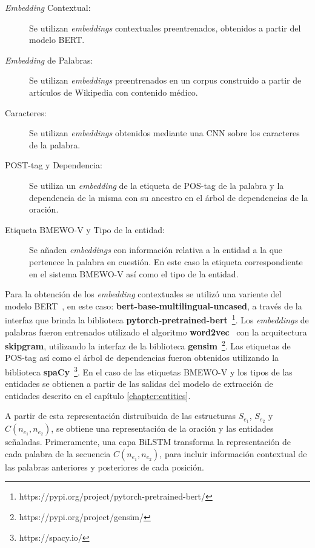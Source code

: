 \begin{description}
	\item[\textit{Embedding} Contextual:] Se utilizan \textit{embeddings} contextuales preentrenados, obtenidos a partir del modelo BERT.
	
	\item[\textit{Embedding} de Palabras:] Se utilizan \textit{embeddings} preentrenados en un corpus construido a partir de artículos de Wikipedia con contenido médico.
	
	\item[Caracteres:] Se utilizan \textit{embeddings} obtenidos mediante una CNN sobre los caracteres de la palabra.
	
	\item[POST-tag y Dependencia:] Se utiliza un \textit{embedding} de la etiqueta de POS-tag de la palabra y la dependencia de la misma con su ancestro en el árbol de dependencias de la oración.
	
	\item[Etiqueta BMEWO-V y Tipo de la entidad:] Se añaden \textit{embeddings} con información relativa a la entidad a la que pertenece la palabra en cuestión.
	En este caso la etiqueta correspondiente en el sistema BMEWO-V así como el tipo de la entidad.
	
\end{description}

Para la obtención de los \textit{embedding} contextuales se utilizó una variente del modelo BERT~\cite{devlin2018bert}, en este caso: \textbf{bert-base-multilingual-uncased}, a través de la interfaz que brinda la biblioteca \textbf{pytorch-pretrained-bert}~\footnote{https://pypi.org/project/pytorch-pretrained-bert/}.
Los \textit{embeddings} de palabras fueron entrenados utilizado el algoritmo \textbf{word2vec}~\cite{mikolov2013efficient} con la arquitectura \textbf{skipgram}, utilizando la interfaz de la biblioteca \textbf{gensim}~\footnote{https://pypi.org/project/gensim/}.
Las etiquetas de POS-tag así como el árbol de dependencias fueron obtenidos utilizando la biblioteca \textbf{spaCy}~\footnote{https://spacy.io/}.
En el caso de las etiquetas BMEWO-V y los tipos de las entidades se obtienen a partir de las salidas del modelo de extracción de entidades descrito en el capítulo \ref{chapter:entities}.

A partir de esta representación distruibuida de las estructuras $S_{e_1}$, $S_{e_2}$ y $C(n_{e_1}, n_{e_2})$, se obtiene una representación de la oración y las entidades señaladas.
Primeramente, una capa BiLSTM transforma la representación de cada palabra de la secuencia $C(n_{e_1}, n_{e_2})$, para incluir información contextual de las palabras anteriores y posteriores de cada posición.

